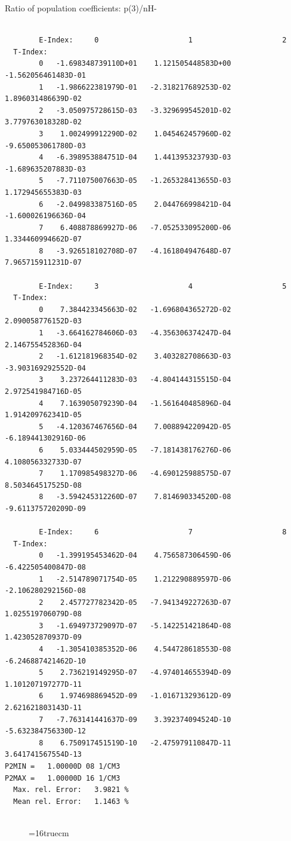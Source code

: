 \documentclass[12pt,dvipdfmx]{article}
\begin{document}
 Ratio of population coefficients: p(3)/nH-
\begin{small}\begin{verbatim}

        E-Index:     0                     1                     2
  T-Index:
        0   -1.698348739110D+01    1.121505448583D+00   -1.562056461483D-01
        1   -1.986622381979D-01   -2.318217689253D-02    1.896031486639D-02
        2   -3.050975728615D-03   -3.329699545201D-02    3.779763018328D-02
        3    1.002499912290D-02    1.045462457960D-02   -9.650053061780D-03
        4   -6.398953884751D-04    1.441395323793D-03   -1.689635207883D-03
        5   -7.711075007663D-05   -1.265328413655D-03    1.172945655383D-03
        6   -2.049983387516D-05    2.044766998421D-04   -1.600026196636D-04
        7    6.408878869927D-06   -7.052533095200D-06    1.334460994662D-07
        8   -3.926518102708D-07   -4.161804947648D-07    7.965715911231D-07

        E-Index:     3                     4                     5
  T-Index:
        0    7.384423345663D-02   -1.696804365272D-02    2.090058776152D-03
        1   -3.664162784606D-03   -4.356306374247D-04    2.146755452836D-04
        2   -1.612181968354D-02    3.403282708663D-03   -3.903169292552D-04
        3    3.237264411283D-03   -4.804144315515D-04    2.972541984716D-05
        4    7.163905079239D-04   -1.561640485896D-04    1.914209762341D-05
        5   -4.120367467656D-04    7.008894220942D-05   -6.189441302916D-06
        6    5.033444502959D-05   -7.181438176276D-06    4.108056332733D-07
        7    1.170985498327D-06   -4.690125988575D-07    8.503464517525D-08
        8   -3.594245312260D-07    7.814690334520D-08   -9.611375720209D-09

        E-Index:     6                     7                     8
  T-Index:
        0   -1.399195453462D-04    4.756587306459D-06   -6.422505400847D-08
        1   -2.514789071754D-05    1.212290889597D-06   -2.106280292156D-08
        2    2.457727782342D-05   -7.941349227263D-07    1.025519706079D-08
        3   -1.694973729097D-07   -5.142251421864D-08    1.423052870937D-09
        4   -1.305410385352D-06    4.544728618553D-08   -6.246887421462D-10
        5    2.736219149295D-07   -4.974014655394D-09    1.101207197277D-11
        6    1.974698869452D-09   -1.016713293612D-09    2.621621803143D-11
        7   -7.763141441637D-09    3.392374094524D-10   -5.632384756330D-12
        8    6.750917451519D-10   -2.475979110847D-11    3.641741567554D-13
P2MIN =   1.00000D 08 1/CM3
P2MAX =   1.00000D 16 1/CM3
  Max. rel. Error:   3.9821 %
  Mean rel. Error:   1.1463 %


\end{verbatim}\end{small}
\begin{figure} \label{7.2a}
\epsfxsize=16truecm
\end{figure}
\newpage
\end{document}
